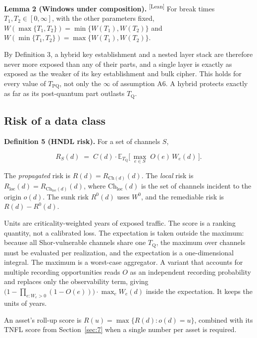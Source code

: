 \documentclass[conference]{IEEEtran}
\newcommand{\Tq}{T_{\mathrm{Q}}}
\newcommand{\Ch}{\mathrm{Ch}}
\providecommand{\E}{}\renewcommand{\E}{\mathbb{E}}
\providecommand{\gt}{}\renewcommand{\gt}{>}
\newcommand{\leantag}{\textsuperscript{\textsf{\scriptsize[Lean]}}}
\newenvironment{envblock}{\par\smallskip\noindent\ignorespaces}{\par\smallskip}
\begin{document}
\begin{envblock}

\textbf{Lemma 2 (Windows under composition).} \leantag{} For break times $T_1, T_2 \in [0, \infty]$, with the other parameters fixed, $W(\max\{T_1, T_2\}) = \min\{W(T_1), W(T_2)\}$ and $W(\min\{T_1, T_2\}) = \max\{W(T_1), W(T_2)\}$.
\end{envblock}

By Definition 3, a hybrid key establishment and a nested layer stack are therefore never more exposed than any of their parts, and a single layer is exactly as exposed as the weaker of its key establishment and bulk cipher. This holds for every value of $T_{\mathrm{PQ}}$, not only the $\infty$ of assumption A6. A hybrid protects exactly as far as its post-quantum part outlasts $\Tq$.

\subsection{Risk of a data class}\label{sec:6.2}

\begin{envblock}

\textbf{Definition 5 (HNDL risk).} For a set of channels $S$,

\[ R_S(d) \;=\; C(d)\cdot \E_{\Tq}\!\Big[\, \max_{e \in S}\; O(e)\, W_e(d) \,\Big]. \]

The \emph{propagated} risk is $R(d) = R_{\Ch(d)}(d)$. The \emph{local} risk is $R_{\mathrm{loc}}(d) = R_{\Ch_{\mathrm{loc}}(d)}(d)$, where $\Ch_{\mathrm{loc}}(d)$ is the set of channels incident to the origin $o(d)$. The sunk risk $R^0(d)$ uses $W^0$, and the remediable risk is $R(d) - R^0(d)$.
\end{envblock}

Units are criticality-weighted years of exposed traffic. The score is a ranking quantity, not a calibrated loss. The expectation is taken outside the maximum: because all Shor-vulnerable channels share one $\Tq$, the maximum over channels must be evaluated per realization, and the expectation is a one-dimensional integral. The maximum is a worst-case aggregator. A variant that accounts for multiple recording opportunities reads $O$ as an independent recording probability and replaces only the observability term, giving $\big(1 - \prod_{e : W_e \gt 0} (1 - O(e))\big) \cdot \max_e W_e(d)$ inside the expectation. It keeps the units of years.

An asset's roll-up score is $R(u) = \max\{R(d) : o(d) = u\}$, combined with its TNFL score from Section~\ref{sec:7} when a single number per asset is required.
\end{document}
